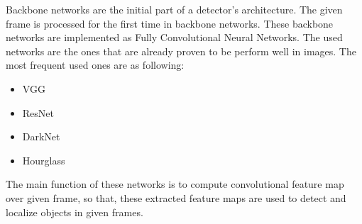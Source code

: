 \documentclass{article}
\begin{document}
\setlength{\parindent}{6ex}

\indent

Backbone networks are the initial part of a detector's architecture.
The given frame is processed for the first time in backbone networks.
These backbone networks are implemented as Fully Convolutional Neural
Networks. The used networks are the ones that are already proven to be 
perform well in images. The most frequent used ones are as following:
\begin{itemize}
    \item VGG
    \item ResNet
    \item DarkNet
    \item Hourglass
\end{itemize}
\indent

The main function of these networks is to compute convolutional feature map
over given frame, so that, these extracted feature maps are used to detect 
and localize objects in given frames.
\end{document}
